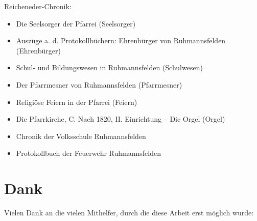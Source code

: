 \documentclass{book}
\begin{document}
\noindent Reicheneder-Chronik:

\begin{itemize}

\item Die Seelsorger der Pfarrei (Seelsorger)
\item Auszüge a. d. Protokollbüchern: Ehrenbürger von Ruhmannsfelden
(Ehren\-bürger)
\item Schul- und Bildungswesen in Ruhmannsfelden (Schulwesen)
\item Der Pfarrmesner von Ruhmannsfelden (Pfarrmesner)
\item Religiöse Feiern in der Pfarrei (Feiern)
\item Die Pfarrkirche, C. Nach 1820, II. Einrichtung – Die Orgel (Orgel)
\item Chronik der Volksschule Ruhmannsfelden
\item Protokollbuch der Feuerwehr Ruhmannsfelden

\end{itemize}

\section{Dank}

Vielen Dank an die vielen Mithelfer, durch die diese Arbeit erst möglich
wurde:
\end{document}
